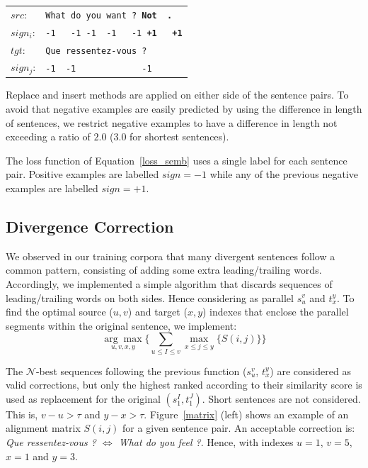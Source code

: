 \documentclass[11pt,a4paper]{article}
\begin{document}
\begin{table}[h]
\small
\center
\begin{tabular}{ll}
$src$: & { \small \texttt{What do you want ? {\bf Not \ .}}} \\
$sign_i$: & { \small \texttt{-1 \ \  -1 -1 \ -1  \ \ -1 {\bf +1\ \ \  +1}}} \\
$tgt$: & { \small \texttt{Que ressentez-vous ?}} \\
$sign_j$: & { \small \texttt{-1\ \ -1\ \ \ \ \ \ \ \ \ \ \ \ \ -1}} \\
\end{tabular}
\end{table}

Replace and insert methods are applied on either side of the sentence pairs.
To avoid that negative examples are easily predicted by using the difference in length of sentences, we restrict negative examples to have a difference in length not exceeding a ratio of $2.0$ ($3.0$ for shortest sentences).

The loss function of Equation~\ref{loss_semb} uses a single label for each sentence pair. 
Positive examples are labelled $sign=-1$ while any of the previous negative examples are labelled $sign=+1$.

\subsection{Divergence Correction}
\label{correction}

We observed in our training corpora that many divergent sentences follow a common pattern, consisting of adding some extra leading/trailing words. %
Accordingly, we implemented a simple algorithm that discards sequences of leading/trailing words on both sides. 
Hence considering as parallel $s_u^v$ and $t_x^y$. 
To find the optimal source ($u, v$) and target ($x, y$) indexes that enclose the parallel segments within the original sentence, we implement:
\begin{equation*}
\underset{u, v, x, y}{\arg\max} \Big \{      \underset{u \le I \le v}{\sum} \underset{x \le j \le y}{\max} \{ S(i,j) \}    \Big \}
\end{equation*}

The $\mathcal{N}$-best sequences following the previous function ($s_u^v$, $t_x^y$) are considered as valid corrections, but only the highest ranked according to their similarity score is used as replacement for the original $(s_1^I, t_1^J)$.
Short sentences are not considered. This is, $v - u > \tau$ and $y - x > \tau $. 
Figure~\ref{matrix} (left) shows an example of an alignment matrix $S(i,j)$ for a given sentence pair. 
An acceptable correction is: \textit{Que ressentez-vous ? $\Leftrightarrow$ What do you feel ?}. 
Hence, with indexes $u=1$, $v=5$, $x=1$ and $y=3$.
\end{document}
